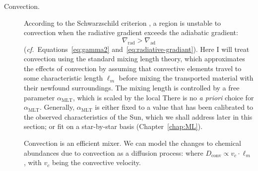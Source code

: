 \begin{description}
    \item[Convection.] 
    According to the Schwarzschild criterion \citep[e.g.,][]{1958ses..book.....S}, a region is unstable to convection when the radiative gradient exceeds the adiabatic gradient: 
    \begin{equation}
        \nabla_{\text{rad}} 
        > 
        \nabla_{\text{ad}}
    \end{equation}
    (\emph{cf.}~Equations~\ref{eq:gamma2} and~\ref{eq:radiative-gradiant}). 
    Here I will treat convection using the standard \citet{1958ZA.....46..108B} mixing length theory, which approximates the effects of convection by assuming that convective elements travel to some characteristic length $\ell_m$ before mixing the transported material with their newfound surroundings. %
    The mixing length is controlled by a free parameter $\alpha_{\text{MLT}}$, which is scaled by the local 
    There is no \emph{a priori} choice for $\alpha_{\text{MLT}}$. 
    Generally, $\alpha_{\text{MLT}}$ is either fixed to a value that has been calibrated to the observed characteristics of the Sun, which we shall address later in this section; or fit on a star-by-star basis (Chapter~\ref{chap:ML}). 
    
    Convection is an efficient mixer. %
    We can model the changes to chemical abundances due to convection as a diffusion process:
    where ${D_{\text{conv}} \propto v_c \cdot \ell_m}$, with $v_c$ being the convective velocity.
    

\end{description}
